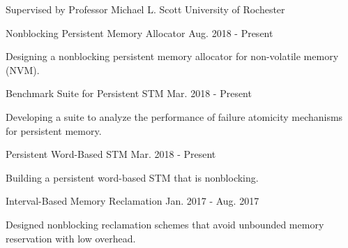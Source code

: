

\begin{cventries}

  \cvexpinfo
    {Supervised by Professor Michael L. Scott} %
    {University of Rochester} %

  \cvexpdetail
    {Nonblocking Persistent Memory Allocator} %
    {Aug. 2018 - Present} %
    {
      \begin{cvitems} %
        \item {Designing a nonblocking persistent memory allocator for non-volatile memory (NVM).}
      \end{cvitems}
    }

  \cvexpdetail
    {Benchmark Suite for Persistent STM} %
    {Mar. 2018 - Present} %
    {
      \begin{cvitems} %
        \item {Developing a suite to analyze the performance of failure atomicity mechanisms for persistent memory.}
      \end{cvitems}
    }

  \cvexpdetail
    {Persistent Word-Based STM} %
    {Mar. 2018 - Present} %
    {
      \begin{cvitems} %
        \item {Building a persistent word-based STM that is nonblocking.}
      \end{cvitems}
    }

  \cvexpdetail
    {Interval-Based Memory Reclamation} %
    {Jan. 2017 - Aug. 2017} %
    {
      \begin{cvitems} %
        \item {Designed nonblocking reclamation schemes that avoid unbounded memory reservation with low overhead.}
      \end{cvitems}
    }


\end{cventries}
